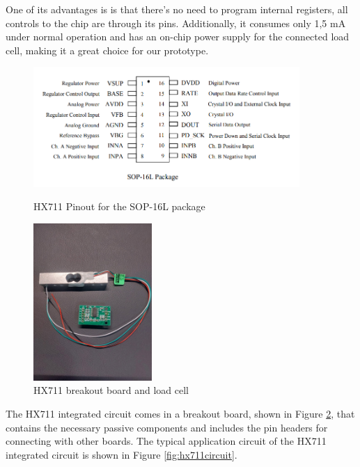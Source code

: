 One of its advantages is is that there's no need to program internal registers,
all controls to the chip are through its pins. Additionally, it consumes only
1,5 mA under normal operation and has an on-chip power supply for the connected
load cell, making it a great choice for our prototype.

\begin{figure}[H]
	\centering
	\caption[HX711 Pinout for the SOP-16L package]{HX711 Pinout for the SOP-16L package}
    \includegraphics[width=0.9\textwidth]{./images/hx711-pinout.png}
	\label{fig:hx711pinout}
\end{figure}

\begin{figure}[H]
	\centering
	\includegraphics[width=0.4\textwidth]{./images/hx711.jpeg}
	\caption[HX711 breakout board and load cell]{HX711 breakout board and load cell}
	\fonte{}
	\label{fig:weighttesting}
\end{figure}

The HX711 integrated circuit comes in a breakout board, shown in Figure
\ref{fig:weighttesting}, that contains the necessary passive components and
includes the pin headers for connecting with other boards. The typical application 
circuit of the HX711 integrated circuit is shown in Figure \ref{fig:hx711circuit}.

